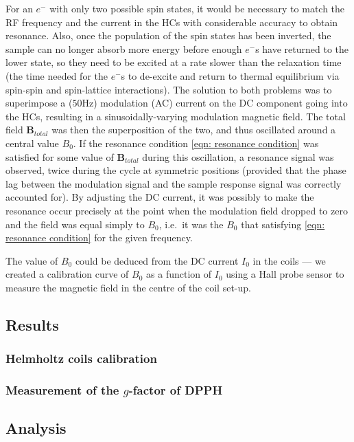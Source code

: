 \documentclass[a4paper]{jpconf}
\numberwithin{equation}{section}
\begin{document}
For an $e^-$ with only two possible spin states, it would be necessary to match the RF frequency and the current in the HCs with considerable accuracy to obtain resonance. Also, once the population of the spin states has been inverted, the sample can no longer absorb more energy before enough $e^-$s have returned to the lower state, so they need to be excited at a rate slower than the relaxation time (the time needed for the $e^-$s to de-excite and return to thermal equilibrium via spin-spin and spin-lattice interactions). The solution to both problems was to superimpose a ($50 \si{\hertz}$) modulation (AC) current on the DC component going into the HCs, resulting in a sinusoidally-varying modulation magnetic field. The total field $\mathbf{B}_{total}$ was then the superposition of the two, and thus oscillated around a central value $B_0$. If the resonance condition \eqref{eqn: resonance condition} was satisfied for some value of $\mathbf{B}_{total}$ during this oscillation, a resonance signal was observed, twice during the cycle at symmetric positions (provided that the phase lag between the modulation signal and the sample response signal was correctly accounted for). By adjusting the DC current, it was possibly to make the resonance occur precisely at the point when the modulation field dropped to zero and the field was equal simply to $B_0$, i.e.\ it was the $B_0$ that satisfying \eqref{eqn: resonance condition} for the given frequency.

The value of $B_0$ could be deduced from the DC current $I_0$ in the coils --- we created a calibration curve of $B_0$ as a function of $I_0$ using a Hall probe sensor to measure the magnetic field in the centre of the coil set-up.

\subsection{Results}
\subsubsection{Helmholtz coils calibration}
\subsubsection{Measurement of the $g$-factor of DPPH}

\subsection{Analysis}
\end{document}
